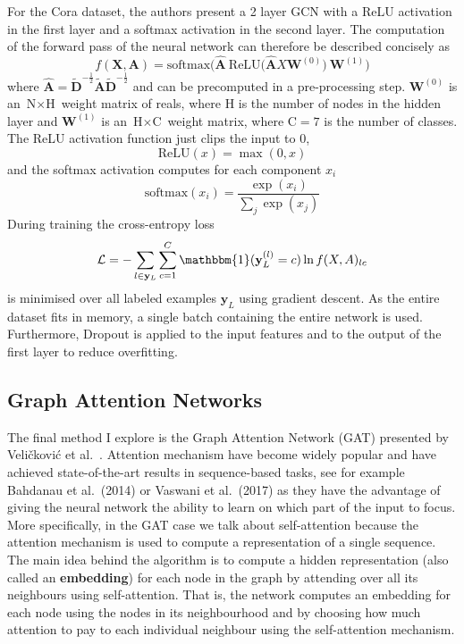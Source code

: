 \documentclass[12pt]{article}
\theoremstyle{definition}
\begin{document}
\bigskip

For the Cora dataset, the authors present a 2 layer GCN with a ReLU activation in the first layer and a softmax activation in the second layer. The computation of the forward pass of the neural network can therefore be described concisely as
\[
f(\mathbf{X},\mathbf{A}) = \textrm{softmax}\big(\hat{\mathbf{A}}\ \textrm{ReLU}\big( \hat{\mathbf{A}} X \mathbf{W}^{(0)} \big)\ \mathbf{W}^{(1)} \big)
\]
where $\hat{\mathbf{A}} = \tilde{\mathbf{D}}^{-\frac{1}{2}} \tilde{\mathbf{A}} \tilde{\mathbf{D}}^{-\frac{1}{2}}$ and can be precomputed in a pre-processing step. $\mathbf{W}^{(0)}$ is an $\textrm{N} \times \textrm{H}$ weight matrix of reals, where $\textrm{H}$ is the number of nodes in the hidden layer and $\mathbf{W}^{(1)}$ is an $\textrm{H} \times \textrm{C}$ weight matrix, where $\textrm{C} = 7$ is the number of classes. The ReLU activation function just clips the input to 0,
\[
\textrm{ReLU}(x) = \max(0, x)
\]
and the softmax activation computes for each component $x_i$
\[
\textrm{softmax}(x_i) = \frac{\exp(x_i)}{\sum_j \exp(x_j)}
\]
During training the cross-entropy loss 
\[
\mathcal{L} = - \sum_{l \in \mathbf{y}_L} \sum_{c=1}^{C} \mathbbm{1}(
\textbf{y}_{L}^{(l)} = c) \ln f(X,A)_{lc}
\]
is minimised over all labeled examples $\textbf{y}_L$ using gradient descent. As the entire dataset fits in memory, a single batch containing the entire network is used. Furthermore, Dropout \cite{srivastava2014dropout} is applied to the input features and to the output of the first layer to reduce overfitting.

\subsection{Graph Attention Networks}
The final method I explore is the Graph Attention Network (GAT) presented by Veli{\v{c}}kovi{\'{c}} et al.\ \cite{velickovic2018graph}. Attention mechanism have become widely popular and have achieved state-of-the-art results in sequence-based tasks, see for example Bahdanau et al.\ (2014) \cite{bahdanau2014neural} or Vaswani et al.\ (2017) \cite{vaswani2017attention} as they have the advantage of giving the neural network the ability to learn on which part of the input to focus. More specifically, in the GAT case we talk about self-attention because the attention mechanism is used to compute a representation of a single sequence. The main idea behind the algorithm is to compute a hidden representation (also called an \textbf{embedding}) for each node in the graph by attending over all its neighbours using self-attention. That is, the network computes an embedding for each node using the nodes in its neighbourhood and by choosing how much attention to pay to each individual neighbour using the self-attention mechanism.
\end{document}
